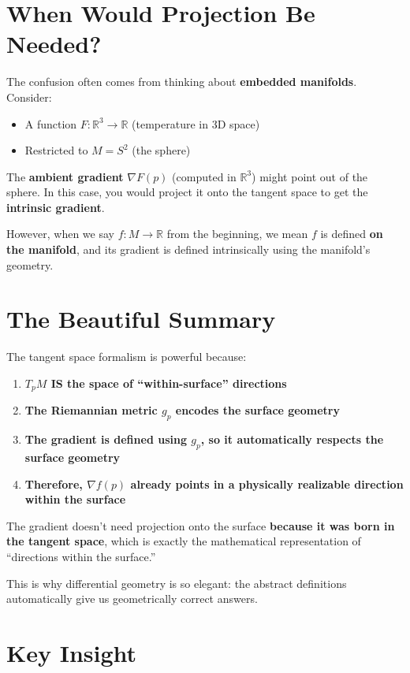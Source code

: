 \begin{notechapter}
\section{When Would Projection Be Needed?}

The confusion often comes from thinking about \textbf{embedded manifolds}. Consider:

\begin{itemize}
\item A function $F: \mathbb{R}^3 \to \mathbb{R}$ (temperature in 3D space)
\item Restricted to $M = S^2$ (the sphere)
\end{itemize}

The \textbf{ambient gradient} $\nabla F(p)$ (computed in $\mathbb{R}^3$) might point out of the sphere. In this case, you would project it onto the tangent space to get the \textbf{intrinsic gradient}.

However, when we say $f: M \to \mathbb{R}$ from the beginning, we mean $f$ is defined \textbf{on the manifold}, and its gradient is defined intrinsically using the manifold's geometry.

\section{The Beautiful Summary}

The tangent space formalism is powerful because:

\begin{enumerate}
\item \textbf{$T_p M$ IS the space of ``within-surface'' directions}
\item \textbf{The Riemannian metric $g_p$ encodes the surface geometry}
\item \textbf{The gradient is defined using $g_p$, so it automatically respects the surface geometry}
\item \textbf{Therefore, $\nabla f(p)$ already points in a physically realizable direction within the surface}
\end{enumerate}

The gradient doesn't need projection onto the surface \textbf{because it was born in the tangent space}, which is exactly the mathematical representation of ``directions within the surface.''

This is why differential geometry is so elegant: the abstract definitions automatically give us geometrically correct answers.

\section*{Key Insight}


\end{notechapter}
